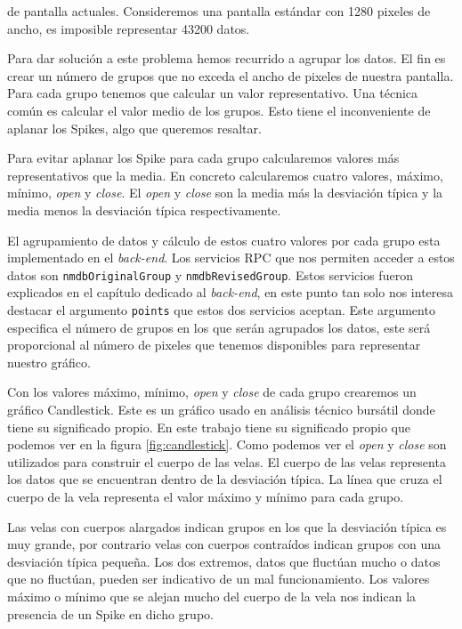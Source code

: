 	de pantalla actuales. Consideremos una pantalla estándar con 1280 pixeles de ancho, es imposible representar 43200 datos.
	\par
	Para dar solución a este problema hemos recurrido a agrupar los datos. El fin es crear un número de grupos que no exceda el ancho de pixeles
	de nuestra pantalla. Para cada grupo tenemos que calcular un valor representativo. Una técnica común es calcular el valor medio de los grupos.
	Esto tiene el inconveniente de aplanar los Spikes, algo que queremos resaltar.
	\par
	Para evitar aplanar los Spike para cada grupo calcularemos valores más representativos que la media. En concreto calcularemos cuatro valores,
	máximo, mínimo, \emph{open} y \emph{close}. El \emph{open} y \emph{close} son la media más la desviación típica y la media menos la desviación
	típica respectivamente.
	\par
	El agrupamiento de datos y cálculo de estos cuatro valores por cada grupo esta implementado en el \emph{back-end}. Los servicios RPC que nos
	permiten acceder a estos datos son \texttt{nmdbOriginalGroup} y \texttt{nmdbRevisedGroup}. Estos servicios fueron explicados en el capítulo
	dedicado al \emph{back-end}, en este punto tan solo nos interesa destacar el argumento \texttt{points} que estos dos servicios aceptan. Este
	argumento especifica el número de grupos en los que serán agrupados los datos, este será proporcional al número de pixeles que tenemos
	disponibles para representar nuestro gráfico. 
	\par
	Con los valores máximo, mínimo, \emph{open} y \emph{close} de cada grupo crearemos un gráfico Candlestick. Este es un gráfico usado en
	análisis técnico bursátil donde tiene su significado propio. En este trabajo tiene su significado propio que podemos ver en la figura
	\ref{fig:candlestick}. Como podemos ver el \emph{open} y \emph{close} son utilizados para construir el cuerpo de las velas. El cuerpo de las
	velas representa los datos que se encuentran dentro de la desviación típica. La línea que cruza el cuerpo de la vela representa el valor
	máximo y mínimo para cada grupo.
	\par
	Las velas con cuerpos alargados indican grupos en los que la desviación típica es muy grande, por contrario velas con cuerpos contraídos
	indican grupos con una desviación típica pequeña. Los dos extremos, datos que fluctúan mucho o datos que no fluctúan, pueden ser indicativo de
	un mal funcionamiento. Los valores máximo o mínimo que se alejan mucho del cuerpo de la vela nos indican la presencia de un Spike en dicho
	grupo. 

